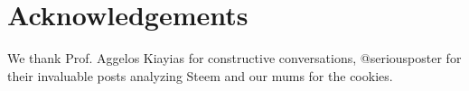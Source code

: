 \section{Acknowledgements}
  We thank Prof. Aggelos Kiayias for constructive conversations, @seriousposter for their invaluable posts analyzing Steem and our mums for the cookies.
